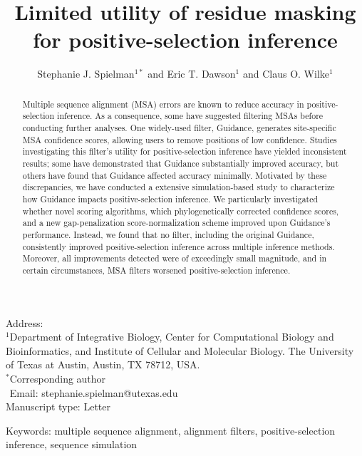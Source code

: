\documentclass[11pt]{article}
\begin{document}
\title{\textbf{Limited utility of residue masking for positive-selection inference}}
\author{Stephanie J. Spielman$^{1*}$ and Eric T. Dawson$^{1}$ and Claus O. Wilke$^{1}$}
\date{}

\maketitle
\noindent
Address:\\
$^1$Department of Integrative Biology, Center for Computational Biology and Bioinformatics, and Institute of Cellular and Molecular Biology.
The University of Texas at Austin, Austin, TX 78712, USA.\\

\bigskip
\noindent
$^*$Corresponding author\\
$\phantom{^*}$Email: stephanie.spielman@utexas.edu\\

\bigskip
\noindent
Manuscript type: Letter

\bigskip
\noindent Keywords: multiple sequence alignment, alignment filters, positive-selection inference, sequence simulation

\newpage
\begin{abstract}
Multiple sequence alignment (MSA) errors are known to reduce accuracy in positive-selection inference. As a consequence, some have suggested filtering MSAs before conducting further analyses. One widely-used filter, Guidance, generates site-specific MSA confidence scores, allowing users to remove positions of low confidence. Studies investigating this filter's utility for positive-selection inference have yielded inconsistent results; some have demonstrated that Guidance substantially improved accuracy, but others have found that Guidance affected accuracy minimally. Motivated by these discrepancies, we have conducted a extensive simulation-based study to characterize how Guidance impacts positive-selection inference. We particularly investigated whether novel scoring algorithms, which phylogenetically corrected confidence scores, and a new gap-penalization score-normalization scheme improved upon Guidance's performance. Instead, we found that no filter, including the original Guidance, consistently improved positive-selection inference across multiple inference methods. Moreover, all improvements detected were of exceedingly small magnitude, and in certain circumstances, MSA filters worsened positive-selection inference. 
\end{abstract}
\end{document}
